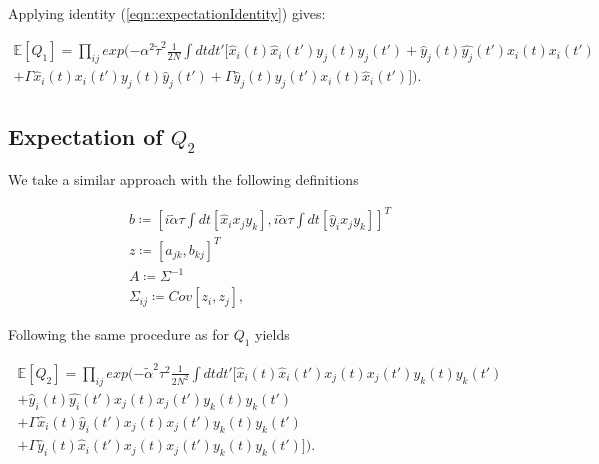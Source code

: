 \documentclass[.../main.tex]{subfiles}
\begin{document}
	Applying identity (\ref{eqn::expectationIdentity}) gives:

	\begin{equation}
	\begin{split}
		\mathbb{E}[Q_1] = \prod_{ij} exp(- \alpha^2 \tilde{\tau}^2 \frac{1}{2N} \int dt dt'[
		\hat{x}_i
		(t) \hat{x}_i
		(t') y_j(t) y_j(t') + \hat{y}_j(t) \hat{y_j}(t') x_i(t) x_i(t') \\ + \Gamma \hat{x}_i(t) 
		{x}_i
		(t') {y}_j(t) \hat{y}_j(t') + \Gamma \hat{y}_j(t) {y}_j(t') {x}_i(t) \hat{x}_i(t')]).
	\end{split}
	\end{equation}


	\subsection{Expectation of $Q_2$} %
	\label{ssub:expectation_of_Q2}
	
	We take a similar approach with the following definitions

	\begin{equation*}
		\begin{split}
			b \coloneqq [i \tilde{\alpha} \tau \int dt[\hat{x}_i x_j y_k], i \tilde{\alpha} 
			\tau
			\int
			dt[\hat{y}_i x_j y_k]]^T \\
			z \coloneqq [a_{jk}, b_{kj}]^T\\
			A \coloneqq \Sigma^{-1}\\
			\Sigma_{ij} \coloneqq Cov[z_i, z_j],
		\end{split}
	\end{equation*}


	Following the same procedure as for $Q_1$ yields

	\begin{equation}
	\begin{split}
		\mathbb{E}[Q_2] = \prod_{ij} exp(- \tilde{\alpha}^2 \tau^2 \frac{1}{2N^2} \int dt dt'[
		\hat{x}_i
		(t) \hat{x}_i
		(t') x_j(t) x_j(t') y_k(t) y_k(t') \\+ \hat{y}_i(t) \hat{y_i}(t') x_j(t) x_j(t') y_k(t)
		y_k(t') \\ + \Gamma \hat{x}_i(t) \hat{y}_i(t')
		{x}_j
		(t) x_j{(t')} {y}_k(t) y_k(t') \\ + \Gamma \hat{y}_i(t) \hat{x}_i(t') {x}_j(t) {x}_j(t')
		y_k(t) y_k(t')]).
	\end{split}
	\end{equation}
\end{document}

